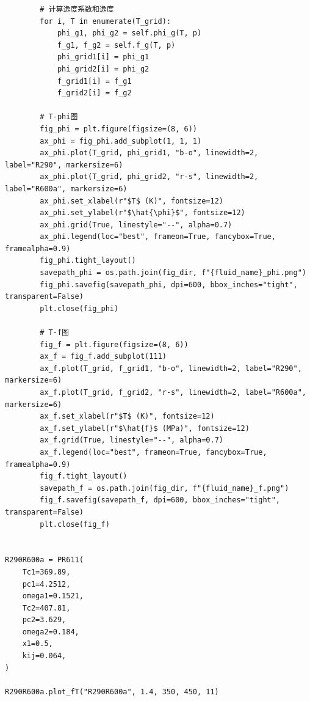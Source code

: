 \documentclass[12pt,a4paper]{article}
\begin{document}
\begin{lstlisting}
        # 计算逸度系数和逸度
        for i, T in enumerate(T_grid):
            phi_g1, phi_g2 = self.phi_g(T, p)
            f_g1, f_g2 = self.f_g(T, p)
            phi_grid1[i] = phi_g1
            phi_grid2[i] = phi_g2
            f_grid1[i] = f_g1
            f_grid2[i] = f_g2

        # T-phi图
        fig_phi = plt.figure(figsize=(8, 6))
        ax_phi = fig_phi.add_subplot(1, 1, 1)
        ax_phi.plot(T_grid, phi_grid1, "b-o", linewidth=2, label="R290", markersize=6)
        ax_phi.plot(T_grid, phi_grid2, "r-s", linewidth=2, label="R600a", markersize=6)
        ax_phi.set_xlabel(r"$T$ (K)", fontsize=12)
        ax_phi.set_ylabel(r"$\hat{\phi}$", fontsize=12)
        ax_phi.grid(True, linestyle="--", alpha=0.7)
        ax_phi.legend(loc="best", frameon=True, fancybox=True, framealpha=0.9)
        fig_phi.tight_layout()
        savepath_phi = os.path.join(fig_dir, f"{fluid_name}_phi.png")
        fig_phi.savefig(savepath_phi, dpi=600, bbox_inches="tight", transparent=False)
        plt.close(fig_phi)

        # T-f图
        fig_f = plt.figure(figsize=(8, 6))
        ax_f = fig_f.add_subplot(111)
        ax_f.plot(T_grid, f_grid1, "b-o", linewidth=2, label="R290", markersize=6)
        ax_f.plot(T_grid, f_grid2, "r-s", linewidth=2, label="R600a", markersize=6)
        ax_f.set_xlabel(r"$T$ (K)", fontsize=12)
        ax_f.set_ylabel(r"$\hat{f}$ (MPa)", fontsize=12)
        ax_f.grid(True, linestyle="--", alpha=0.7)
        ax_f.legend(loc="best", frameon=True, fancybox=True, framealpha=0.9)
        fig_f.tight_layout()
        savepath_f = os.path.join(fig_dir, f"{fluid_name}_f.png")
        fig_f.savefig(savepath_f, dpi=600, bbox_inches="tight", transparent=False)
        plt.close(fig_f)


R290R600a = PR611(
    Tc1=369.89,
    pc1=4.2512,
    omega1=0.1521,
    Tc2=407.81,
    pc2=3.629,
    omega2=0.184,
    x1=0.5,
    kij=0.064,
)

R290R600a.plot_fT("R290R600a", 1.4, 350, 450, 11)
\end{lstlisting}
\end{document}
